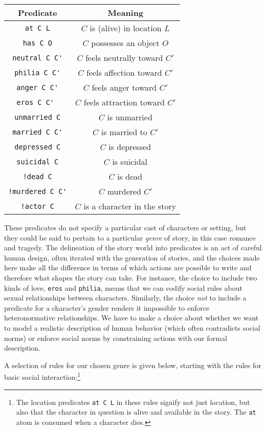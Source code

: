 \documentclass[letterpaper]{article}
\begin{document}
\begin{tabular}{c|c}
Predicate & Meaning\\
\hline
\verb|at C L|       & $C$ is (alive) in location $L$\\
\verb|has C O|      & $C$ possesses an object $O$\\
\verb|neutral C C'| & $C$ feels neutrally toward $C'$\\
\verb|philia C C'|  & $C$ feels affection toward $C'$\\
\verb|anger C C'|   & $C$ feels anger toward $C'$\\
\verb|eros C C' |   & $C$ feels attraction toward $C'$\\
\verb|unmarried C|  & $C$ is unmarried\\
\verb|married C C'| & $C$ is married to $C'$\\
\verb|depressed C|  & $C$ is depressed\\
\verb|suicidal C|   & $C$ is suicidal\\
\verb|!dead C|      & $C$ is dead\\
\verb|!murdered C C'| & $C$ murdered $C'$\\
\verb|!actor C|     & $C$ is a character in the story
\end{tabular}

These predicates do not specify a particular cast of characters or setting,
but they could be said to pertain to a particular {\em genre} of story, in
this case romance and tragedy. The delineation of the story world into
predicates is an act of careful human design, often iterated with the
generation of stories, and the choices made here make all the difference in
terms of which actions are possible to write and therefore what shapes the
story can take. For instance, the choice to include two kinds of love,
\verb|eros| and \verb|philia|, means that we can codify social rules about
sexual relationships between characters. Similarly, the choice {\em not} to
include a predicate for a character's gender renders it impossible to
enforce heteronormative relationships. We have to make a choice about
whether we want to model a realistic description of human behavior (which
often contradicts social norms) or enforce social norms by constraining
actions with our formal description. 

A selection of rules for our chosen genre is given below, starting with the
rules for basic social interaction:\footnote{The location predicates
\texttt{at C L} in these rules signify not just location, but also that the
character in question is alive and available in the story. The \texttt{at}
atom is consumed when a character dies.}
\end{document}
